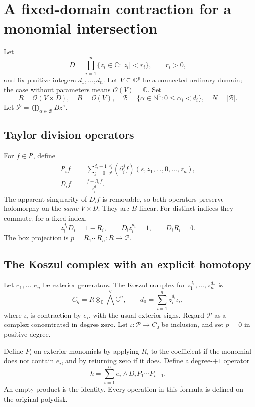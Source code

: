 \documentclass[11pt,letterpaper]{article}
\theoremstyle{definition}
\theoremstyle{remark}
\newcommand{\C}{\mathbb C}
\newcommand{\N}{\mathbb N}
\newcommand{\OO}{\mathcal O}
\newcommand{\BB}{\mathcal B}
\newcommand{\PP}{\mathcal P}
\numberwithin{equation}{section}
\begin{document}
\section{A fixed-domain contraction for a monomial intersection}\label{sec:contraction}
Let
\[
 D=\prod_{i=1}^n\{z_i\in\C:|z_i|<r_i\},\qquad r_i>0,
\]
and fix positive integers $d_1,\ldots,d_n$. Let $V\subseteq\C^p$ be a connected ordinary domain; the case without parameters means $\OO(V)=\C$. Set
\[
 R=\OO(V\times D),\quad B=\OO(V),\quad
 \BB=\{\alpha\in\N^n:0\le\alpha_i<d_i\},\quad N=|\BB|.
\]
Let $\PP=\bigoplus_{\alpha\in\BB}Bz^\alpha$.

\subsection{Taylor division operators}
For $f\in R$, define
\begin{align}
 R_i f&=\sum_{j=0}^{d_i-1}\frac{z_i^j}{j!}
   (\partial_i^j f)(s,z_1,\ldots,0,\ldots,z_n),\label{eq:Ri}\\
 D_i f&=\frac{f-R_i f}{z_i^{d_i}}.\label{eq:Di}
\end{align}
The apparent singularity of $D_i f$ is removable, so both operators preserve holomorphy on the \emph{same} $V\times D$. They are $B$-linear. For distinct indices they commute; for a fixed index,
\begin{equation}\label{eq:divrelations}
 z_i^{d_i}D_i=1-R_i,\qquad
 D_i z_i^{d_i}=1,\qquad D_iR_i=0.
\end{equation}
The box projection is $p=R_1\cdots R_n:R\to\PP$.

\subsection{The Koszul complex with an explicit homotopy}
Let $e_1,\ldots,e_n$ be exterior generators. The Koszul complex for $z_1^{d_1},\ldots,z_n^{d_n}$ is
\[
 C_q=R\otimes_\C\bigwedge^q\C^n,
 \qquad d_0=\sum_{i=1}^nz_i^{d_i}\iota_i,
\]
where $\iota_i$ is contraction by $e_i$, with the usual exterior signs. Regard $\PP$ as a complex concentrated in degree zero. Let $\iota:\PP\to C_0$ be inclusion, and set $p=0$ in positive degree.

Define $P_i$ on exterior monomials by applying $R_i$ to the coefficient if the monomial does not contain $e_i$, and by returning zero if it does. Define a degree-$+1$ operator
\begin{equation}\label{eq:h}
 h=\sum_{i=1}^n e_i\wedge D_iP_1\cdots P_{i-1}.
\end{equation}
An empty product is the identity. Every operation in this formula is defined on the original polydisk.
\end{document}
